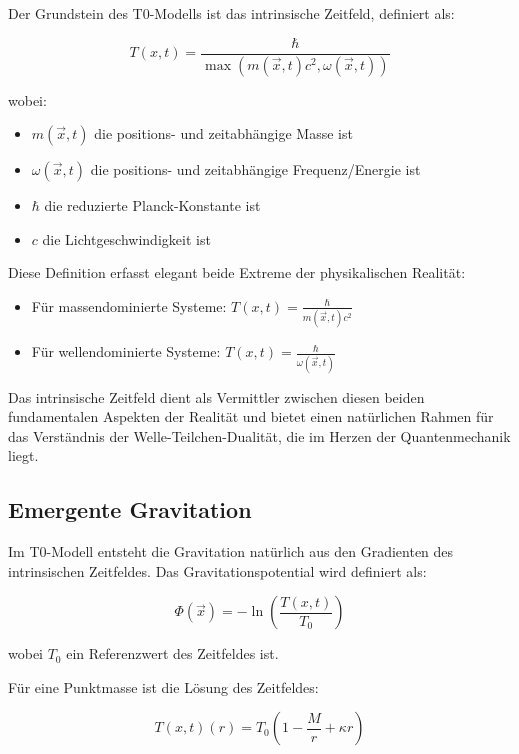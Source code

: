 \documentclass[12pt,a4paper]{article}
\newcommand{\Tfieldt}{T(x,t)}
\newcommand{\Tzero}{T_0}
\newcommand{\vecx}{\vec{x}}
\begin{document}
	Der Grundstein des T0-Modells ist das intrinsische Zeitfeld, definiert als:
	
	\begin{equation}
		\Tfieldt = \frac{\hbar}{\max(m(\vecx,t)c^2, \omega(\vecx,t))}
		\label{eq:time_field}
	\end{equation}
	
	wobei:
	\begin{itemize}
		\item $m(\vecx,t)$ die positions- und zeitabhängige Masse ist
		\item $\omega(\vecx,t)$ die positions- und zeitabhängige Frequenz/Energie ist
		\item $\hbar$ die reduzierte Planck-Konstante ist
		\item $c$ die Lichtgeschwindigkeit ist
	\end{itemize}
	
	Diese Definition erfasst elegant beide Extreme der physikalischen Realität:
	\begin{itemize}
		\item Für massendominierte Systeme: $\Tfieldt = \frac{\hbar}{m(\vecx,t)c^2}$
		\item Für wellendominierte Systeme: $\Tfieldt = \frac{\hbar}{\omega(\vecx,t)}$
	\end{itemize}
	
	Das intrinsische Zeitfeld dient als Vermittler zwischen diesen beiden fundamentalen Aspekten der Realität und bietet einen natürlichen Rahmen für das Verständnis der Welle-Teilchen-Dualität, die im Herzen der Quantenmechanik liegt.
	
	\subsection{Emergente Gravitation}
	\label{subsec:emergent_grav}
	
	Im T0-Modell entsteht die Gravitation natürlich aus den Gradienten des intrinsischen Zeitfeldes. Das Gravitationspotential wird definiert als:
	
	\begin{equation}
		\Phi(\vecx) = -\ln\left(\frac{\Tfieldt}{\Tzero}\right)
		\label{eq:grav_potential}
	\end{equation}
	
	wobei $\Tzero$ ein Referenzwert des Zeitfeldes ist.
	
	Für eine Punktmasse ist die Lösung des Zeitfeldes:
	
	\begin{equation}
		\Tfieldt(r) = \Tzero\left(1 - \frac{M}{r} + \kappa r\right)
		\label{eq:time_field_solution}
	\end{equation}
	
\end{document}
